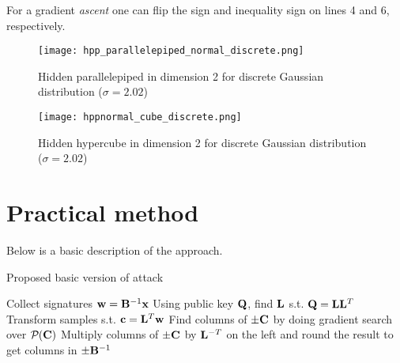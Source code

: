 {{For a gradient \textit{ascent} one can flip the sign and inequality sign on lines 4 and 6, respectively.

\begin{figure}[H]
    \centering
    \texttt{[image: hpp\_parallelepiped\_normal\_discrete.png]}
    \caption{Hidden parallelepiped in dimension 2 for discrete Gaussian distribution ($\sigma = 2.02$)}
  	\medskip 
    \label{parallelepiped_normal_discrete}
\end{figure}

\begin{figure}[H]
    \centering
    \texttt{[image: hppnormal\_cube\_discrete.png]}
    \caption{Hidden hypercube in dimension 2 for discrete Gaussian distribution ($\sigma = 2.02$)}
  	\medskip 
    \label{hypercube_normal_discrete}
\end{figure}
\section{Practical method}

Below is a basic description of the approach.
\begin{algorithm}[H]
\caption{Proposed basic version of attack}
\begin{algorithmic}[1]
    \State Collect signatures $\mathbf{w} = \mathbf{B}^{-1} \mathbf{x}$
    \State Using public key $\mathbf{Q}$, find $\mathbf{L}$ s.t. $\mathbf{Q} = \mathbf{L} \mathbf{L}^T$
    \State Transform samples s.t. $\mathbf{c} = \mathbf{L}^T \mathbf{w}$
    \State Find columns of $\pm \mathbf{C}$ by doing gradient search over $\mathcal{P}_{}(\mathbf{C})$
    \State Multiply columns of $\pm \mathbf{C}$ by $\mathbf{L}^{-T}$ on the left and round the result to get columns in $\pm \mathbf{B}^{-1}$
\end{algorithmic}
\end{algorithm}

}}
